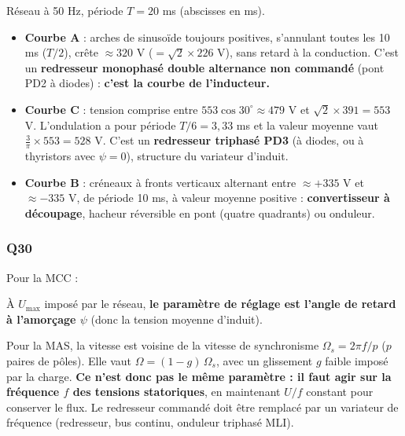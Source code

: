 \documentclass[11pt,a4paper]{article}
\providecommand{\tightlist}{\setlength{\itemsep}{0pt}\setlength{\parskip}{0pt}}
\newcommand{\equationajustee}[1]{%
  \sbox{\boiteequation}{$\displaystyle #1$}%
  \ifdim\wd\boiteequation>\linewidth
    \[\resizebox{\linewidth}{!}{\usebox{\boiteequation}}\]%
  \else
    \[#1\]%
  \fi}
\begin{document}
Réseau à 50 Hz, période \(T=20\) ms (abscisses en ms).

\begin{itemize}
\tightlist
\item
  \textbf{Courbe A} : arches de sinusoïde toujours positives, s'annulant toutes les 10 ms (\(T/2\)), crête \(\approx320\) V (\(=\sqrt2\times226\) V), sans retard à la conduction. C'est un \textbf{redresseur monophasé double alternance non commandé} (pont PD2 à diodes) : \textbf{c'est la courbe de l'inducteur.}
\item
  \textbf{Courbe C} : tension comprise entre \(553\cos30^\circ\approx479\) V et \(\sqrt2\times391=553\) V. L'ondulation a pour période \(T/6=3{,}33\) ms et la valeur moyenne vaut \(\tfrac3\pi\times553=528\) V. C'est un \textbf{redresseur triphasé PD3} (à diodes, ou à thyristors avec \(\psi=0\)), structure du variateur d'induit.
\item
  \textbf{Courbe B} : créneaux à fronts verticaux alternant entre \(\approx+335\) V et \(\approx-335\) V, de période 10 ms, à valeur moyenne positive : \textbf{convertisseur à découpage}, hacheur réversible en pont (quatre quadrants) ou onduleur.
\end{itemize}

\hypertarget{q30}{%
\subsubsection{Q30}\label{q30}}

Pour la MCC :

\equationajustee{\begin{aligned}
\Omega_m&=\frac{\langle U_m\rangle-R\,I}{k}\\
\langle U_m\rangle&=\frac3\pi U_{\max}\cos\psi
\end{aligned}}

À \(U_{\max}\) imposé par le réseau, \textbf{le paramètre de réglage est l'angle de retard à l'amorçage \(\psi\)} (donc la tension moyenne d'induit).

Pour la MAS, la vitesse est voisine de la vitesse de synchronisme \(\Omega_s=2\pi f/p\) (\(p\) paires de pôles). Elle vaut \(\Omega=(1-g)\,\Omega_s\), avec un glissement \(g\) faible imposé par la charge. \textbf{Ce n'est donc pas le même paramètre : il faut agir sur la fréquence \(f\) des tensions statoriques}, en maintenant \(U/f\) constant pour conserver le flux. Le redresseur commandé doit être remplacé par un variateur de fréquence (redresseur, bus continu, onduleur triphasé MLI).
\end{document}
